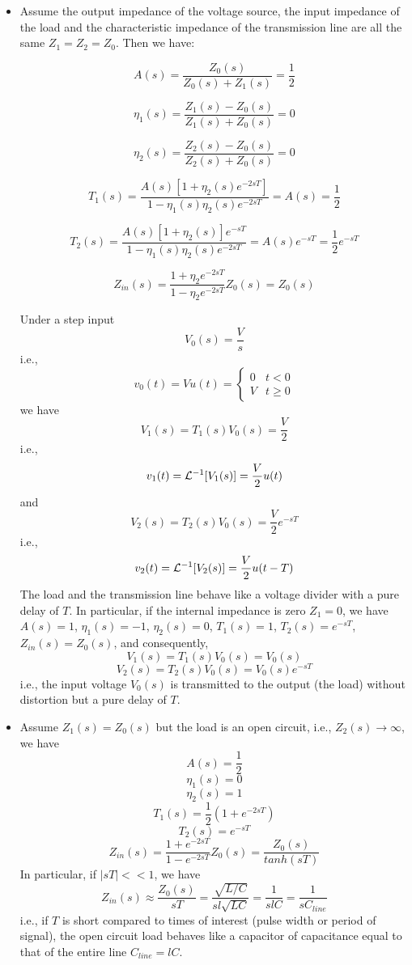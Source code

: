 \begin{itemize}
\item Assume the output impedance of the voltage source, the input
	impedance of the load and the characteristic impedance of
	the transmission line are all the same $Z_1=Z_2=Z_0$. Then we
	have:

\[ A(s)=\frac{Z_0(s)}{Z_0(s)+Z_1(s)}=\frac{1}{2}   \]	

\[ \eta_1(s)=\frac{Z_1(s)-Z_0(s)}{Z_1(s)+Z_0(s)}=0 \]

\[ \eta_2(s)=\frac{Z_2(s)-Z_0(s)}{Z_2(s)+Z_0(s)}=0 \]

\[ T_1(s)=\frac{A(s)[1+\eta_2(s)e^{-2sT}]}{1-\eta_1(s)\eta_2(s)e^{-2sT}}=A(s)=\frac{1}{2}	\]

\[ T_2(s)=\frac{A(s)[1+\eta_2(s)]e^{-sT}}{1-\eta_1(s)\eta_2(s)e^{-2sT}}=A(s)e^{-sT}=\frac{1}{2}e^{-sT}	\]

\[ Z_{in}(s)=\frac{1+\eta_2e^{-2sT}}{1-\eta_2e^{-2sT}}Z_0(s)=Z_0(s) \]

Under a step input 
\[	V_0(s)=\frac{V}{s}	\]
i.e.,
\[	v_0(t)=V u(t)=\left\{ \begin{array}{ll}0 & t<0 \\ V & t \ge 0
	\end{array} \right. \]
we have
\[	V_1(s)=T_1(s)V_0(s)=\frac{V}{2}	\]
i.e., 
\[	v_1(t)={\cal L}^{-1}[V_1(s)]=\frac{V}{2}u(t)	\]
and
\[	V_2(s)=T_2(s)V_0(s)=\frac{V}{2}e^{-sT}	\]
i.e.,
\[	v_2(t)={\cal L}^{-1}[V_2(s)]=\frac{V}{2}u(t-T)	\]
The load and the transmission line behave like a voltage divider with
a pure delay of $T$. In particular, if the internal impedance is zero
$Z_1=0$, we have $A(s)=1$, $\eta_1(s)=-1$, $\eta_2(s)=0$, $T_1(s)=1$,
$T_2(s)=e^{-sT}$, $Z_{in}(s)=Z_0(s)$, and consequently, 
\[	V_1(s)=T_1(s)V_0(s)=V_0(s)	\]
\[	V_2(s)=T_2(s)V_0(s)=V_0(s)e^{-sT}	\]
i.e., the input voltage $V_0(s)$ is transmitted to the output (the 
load) without distortion but a pure delay of $T$. 

\item Assume $Z_1(s)=Z_0(s)$ but the load is an open circuit, i.e., 
$Z_2(s)\rightarrow \infty$, we have
\[	A(s)=\frac{1}{2} \]
\[	\eta_1(s)=0	\]
\[	\eta_2(s)=1	\]
\[	T_1(s)=\frac{1}{2}(1+e^{-2sT})	\]
\[	T_2(s)=e^{-sT}	\]
\[ Z_{in}(s)=\frac{1+e^{-2sT}}{1-e^{-2sT}}Z_0(s)=\frac{Z_0(s)}{tanh(sT)} \]
In particular, if $|sT| << 1$, we have
\[ Z_{in}(s)\approx \frac{Z_0(s)}{sT}=\frac{\sqrt{L/C}}{sl\sqrt{LC}}
	=\frac{1}{slC}=\frac{1}{sC_{line}}	\]
i.e., if $T$ is short compared to times of interest (pulse width or
period of signal), the open circuit load behaves like a capacitor of
capacitance equal to that of the entire line $C_{line}=lC$.


\end{itemize}
